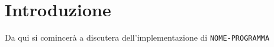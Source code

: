 \chapter{Introduzione}
Da qui si comincerà a discutera dell'implementazione di
\texttt{NOME-PROGRAMMA}





